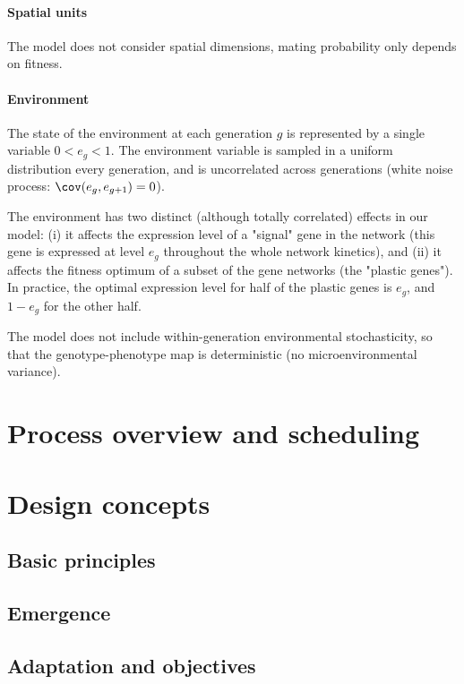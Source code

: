 \documentclass{article}
\begin{document}
\paragraph{Spatial units}

The model does not consider spatial dimensions, mating probability only depends on fitness. 

\paragraph{Environment}

The state of the environment at each generation $g$ is represented by a single variable $0 < e_g < 1$. The environment variable is sampled in a uniform distribution every generation, and is uncorrelated across generations (white noise process: $\cov (e_g, e_{g+1}) = 0$). 

The environment has two distinct (although totally correlated) effects in our model: (i) it affects the expression level of a "signal" gene in the network (this gene is expressed at level $e_g$ throughout the whole network kinetics), and (ii) it affects the fitness optimum of a subset of the gene networks (the "plastic genes"). In practice, the optimal expression level for half of the plastic genes is $e_g$, and $1-e_g$ for the other half. 

The model does not include within-generation environmental stochasticity, so that the genotype-phenotype map is deterministic (no microenvironmental variance). 

\section{Process overview and scheduling}

\section{Design concepts}

\subsection{Basic principles}

\subsection{Emergence}

\subsection{Adaptation and objectives}
\end{document}

